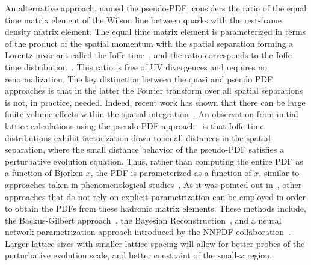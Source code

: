 An alternative approach, named the pseudo-PDF, considers the ratio of the equal time matrix element of the Wilson line between quarks with the rest-frame density matrix element. The equal time matrix element is parameterized in terms of the product of the spatial momentum with the spatial separation forming a Lorentz invariant called the Ioffe time~\cite{Ioffe:1969kf,Braun:1994jq}, and the ratio corresponds to the Ioffe time distribution~\cite{Radyushkin:2016hsy,Radyushkin:2017cyf}.
%
This ratio is free of UV divergences and requires no renormalization. The key distinction between the quasi and pseudo PDF approaches is that in the latter the Fourier transform over all spatial separations is not, in practice, needed. Indeed, recent work has shown that there can be large finite-volume effects within the spatial integration~\cite{Briceno:2018lfj}. An observation from initial lattice calculations using the pseudo-PDF approach~\cite{Orginos:2017kos,Karpie:2018zaz,Karpie:2018zaz}  is that Ioffe-time distributions exhibit factorization down to small distances in the spatial separation, where the small distance behavior of the pseudo-PDF  satisfies a perturbative  evolution equation. Thus, rather than computing the entire PDF as a function of Bjorken-$x$, the PDF is parameterized as a function of $x$, similar to approaches taken in phenomenological studies~\cite{Ball:2017nwa,Accardi:2016qay}. As it was pointed out in~\cite{Karpie:2019eiq}, other approaches that do not rely on explicit parametrization can be employed in order to obtain the PDFs from these hadronic matrix elements. These methods include, the Backus-Gilbert approach~\cite{Backus:1968hl}, the Bayesian Reconstruction~\cite{Burnier:2013nla}, and a neural network parametrization approach introduced by the NNPDF collaboration~\cite{Forte:2002fg,Ball:2017nwa}. Larger lattice sizes with smaller lattice spacing will allow for better probes of the perturbative evolution scale, and better constraint of the small-$x$ region.

